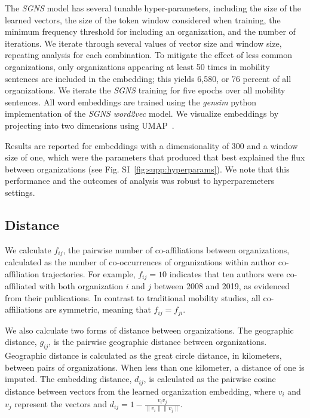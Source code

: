 \documentclass[12pt]{article} %
\def\SGNS{\textit{SGNS}}
\begin{document}
The \SGNS{} model has several tunable hyper-parameters, including the size of the learned vectors, the size of the token window  considered when training, the minimum frequency threshold for including an organization, and the number of iterations.
We iterate through several values of vector size and window size, repeating analysis for each combination. 
To mitigate the effect of less common organizations, only organizations appearing at least 50 times in mobility sentences are included in the embedding;
this yields 6,580, or 76 percent of all organizations.
We iterate the \SGNS{} training for five epochs over all mobility sentences. 
All word embeddings are trained using the \textit{gensim} python implementation of the \SGNS{} \textit{word2vec} model. 
We visualize embeddings by projecting into two dimensions using UMAP~\autocite{mcinnes2018umap}.


Results are reported for embeddings with a dimensionality of 300 and a window size of one, which were the parameters that produced  that best explained the flux between organizations (see Fig. SI~\ref{fig:supp:hyperparams}). 
We note that this performance and the outcomes of analysis was robust to hyperparemeters settings. 


%
%
\subsection{Distance}
We calculate $f_{ij}$, the pairwise number of co-affiliations between organizations, calculated as the number of co-occurrences of organizations within author co-affiliation trajectories. 
For example, $f_{ij} = 10$ indicates that ten authors were co-affiliated with both organization $i$ and $j$ between 2008 and 2019, as evidenced from their publications. 
In contrast to traditional mobility studies, all co-affiliations are symmetric, meaning that $f_{ij} = f_{ji}$. 

We also calculate two forms of distance between organizations. 
The geographic distance, $g_{ij}$, is the pairwise geographic distance between organizations.
Geographic distance is calculated as the great circle distance, in kilometers, between pairs of organizations. 
When less than one kilometer, a distance of one is imputed. 
The embedding distance, $d_{ij}$, is calculated as the pairwise cosine distance between vectors from the learned organization embedding, where $v_{i}$ and $v_{j}$ represent the vectors and $d_{ij} = 1 - \frac{v_{i} \dot v_{j}}{\lVert v_{i} \rVert \lVert v_{j} \rVert}$.
\end{document}
